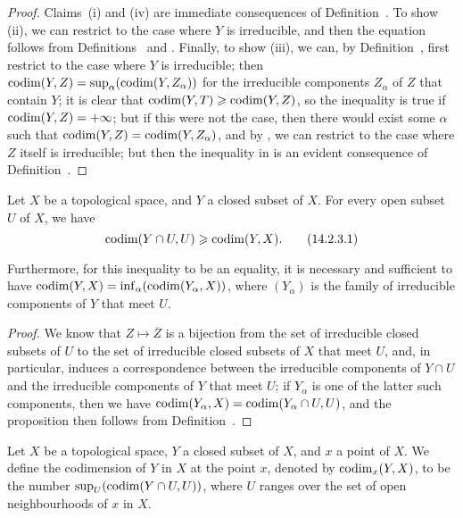 \begin{proof}
\label{proof-0.14.2.2}
Claims~(i) and (iv) are immediate consequences of Definition~.
To show (ii), we can restrict to the case where $Y$ is irreducible, and then the equation follows from Definitions~ and .
Finally, to show (iii), we can, by Definition~, first restrict to the case where $Y$ is irreducible;
then $\operatorname{codim}(Y,Z)=\sup_\alpha(\operatorname{codim}(Y,Z_\alpha))$ for the irreducible components $Z_\alpha$ of $Z$ that contain $Y$;
it is clear that $\operatorname{codim}(Y,T)\geqslant\operatorname{codim}(Y,Z)$, so the inequality is true if $\operatorname{codim}(Y,Z)=+\infty$;
but if this were not the case, then there would exist some $\alpha$ such that $\operatorname{codim}(Y,Z)=\operatorname{codim}(Y,Z_\alpha)$, and by , we can restrict to the case where $Z$ itself is irreducible;
but then the inequality in  is an evident consequence of Definition~.
\end{proof}

\begin{proposition}[14.2.3]
\label{0.14.2.3}
Let $X$ be a topological space, and $Y$ a closed subset of $X$.
For every open subset $U$ of $X$, we have
\[
\label{eq:0.14.2.3.1}
  \operatorname{codim}(Y\cap U,U)\geqslant\operatorname{codim}(Y,X).
  \tag{14.2.3.1}
\]

Furthermore, for this inequality  to be an equality, it is necessary and sufficient to have $\operatorname{codim}(Y,X)=\inf_\alpha(\operatorname{codim}(Y_\alpha,X))$, where $(Y_\alpha)$ is the family of irreducible components of $Y$ that meet $U$.
\end{proposition}

\begin{proof}
\label{proof-0.14.2.3}
We know  that $Z\mapsto\overline{Z}$ is a bijection from the set of irreducible closed subsets of $U$ to the set of irreducible closed subsets of $X$ that meet $U$, and, in particular, induces a correspondence between the irreducible components of $Y\cap U$ and the irreducible components of $Y$ that meet $U$;
if $Y_\alpha$ is one of the latter such components, then we have $\operatorname{codim}(Y_\alpha,X)=\operatorname{codim}(Y_\alpha\cap U,U)$, and the proposition then follows from Definition~.
\end{proof}

\begin{definition}[14.2.4]
\label{0.14.2.4}
Let $X$ be a topological space, $Y$ a closed subset of $X$, and $x$ a point of $X$.
We define the codimension of $Y$ in $X$ at the point $x$, denoted by $\operatorname{codim}_x(Y,X)$, to be the number $\sup_U(\operatorname{codim}(Y\cap U,U))$, where $U$ ranges over the set of open neighbourhoods of $x$ in $X$.
\end{definition}

